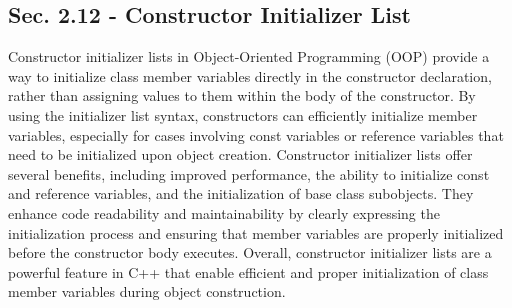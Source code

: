 \subsection*{Sec. 2.12 - Constructor Initializer List}

Constructor initializer lists in Object-Oriented Programming (OOP) provide a way to initialize class member variables directly in the constructor declaration, rather than assigning values to them within the body of the constructor. By using the initializer list syntax, constructors can efficiently 
initialize member variables, especially for cases involving const variables or reference variables that need to be initialized upon object creation. Constructor initializer lists offer several benefits, including improved performance, the ability to initialize const and reference variables, and the 
initialization of base class subobjects. They enhance code readability and maintainability by clearly expressing the initialization process and ensuring that member variables are properly initialized before the constructor body executes. Overall, constructor initializer lists are a powerful feature 
in C++ that enable efficient and proper initialization of class member variables during object construction. \\

